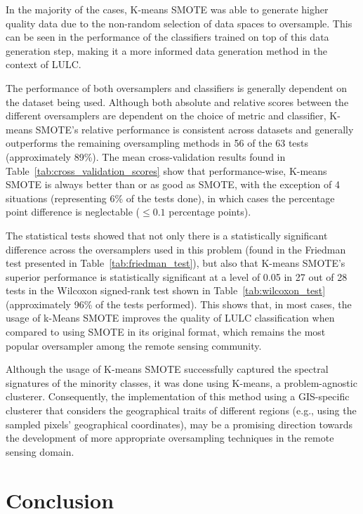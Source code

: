 \documentclass[remotesensing,article,submit,moreauthors,pdftex]{Definitions/mdpi}
\begin{document}
\begin{paracol}{2}
{In the majority of the cases, K-means SMOTE was able to generate higher
quality data due to the non-random selection of data spaces to oversample.
This can be seen in the performance of the classifiers trained on top of this
data generation step, making it a more informed data generation method in the
context of LULC\@.

The performance of both oversamplers and classifiers is generally dependent on
the dataset being used. Although both absolute and relative scores between the
different oversamplers are dependent on the choice of metric and classifier,
K-means SMOTE's relative performance is consistent across datasets and
generally outperforms the remaining oversampling methods in 56 of the 63 tests
(approximately 89\%). The mean cross-validation results found in
Table~\ref{tab:cross_validation_scores} show that performance-wise, K-means
SMOTE is always better than or as good as SMOTE, with the exception of 4
situations (representing 6\% of the tests done), in which cases the percentage
point difference is neglectable ($\leq 0.1$ percentage points). 

The statistical tests showed that not only there is a statistically
significant difference across the oversamplers used in this problem (found in
the Friedman test presented in Table~\ref{tab:friedman_test}), but also that
K-means SMOTE's superior performance is statistically significant at a level
of 0.05 in 27 out of 28 tests in the Wilcoxon signed-rank test shown in
Table~\ref{tab:wilcoxon_test} (approximately 96\% of the tests performed).
This shows that, in most cases, the usage of k-Means SMOTE improves the
quality of LULC classification when compared to using SMOTE in its original
format, which remains the most popular oversampler among the remote sensing
community.

Although the usage of K-means SMOTE successfully captured the spectral
signatures of the minority classes, it was done using K-means, a
problem-agnostic clusterer. Consequently, the implementation of this method
using a GIS-specific clusterer that considers the geographical traits of
different regions (e.g., using the sampled pixels' geographical coordinates),
may be a promising direction towards the development of more appropriate
oversampling techniques in the remote sensing domain.}

\section{Conclusion}~\label{sec:conclusion} 


\end{paracol}
\end{document}
